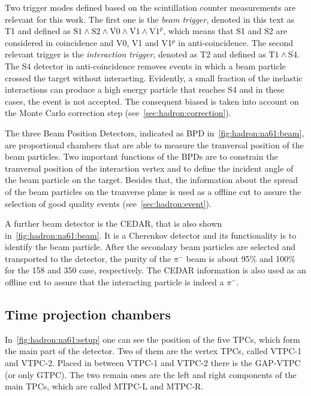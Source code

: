 Two trigger modes defined based on the scintillation counter measurements
are relevant for this work. The first one is the \emph{beam trigger},
denoted in this text as T1 and defined as 
$\text{S1}\wedge\text{S2}\wedge\overline{\text{V0}}\wedge\overline{\text{V1}}\wedge\overline{\text{V1}^p}$,
which means that S1 and S2 are considered in coincidence and V0, V1 and V1$^p$ in anti-coincidence.
The second relevant trigger is the \emph{interaction trigger}, denoted as T2
and defined as 
$\text{T1}\wedge\overline{\text{S4}}$.
The S4 detector in anti-coincidence removes events in which a beam
particle crossed the target without interacting. Evidently,
a small fraction of the inelastic interactions can produce
a high energy particle that reaches S4 and in these cases, the
event is not accepted. The consequent biased is taken into
account on the Monte Carlo correction step (see~\cref{sec:hadron:correction}).

The three Beam Position Detectors, indicated as BPD in~\cref{fig:hadron:na61:beam},
are proportional chambers that are able to measure the tranversal position
of the beam particles. Two important functions of the BPDs are to constrain
the tranversal position of the interaction vertex and to define the
incident angle of the beam particle on the target. Besides that,
the information about the spread of the beam particles on the
tranverse plane is used as a offline cut to assure the
selection of good quality events (see~\cref{sec:hadron:event}).

A further beam detector is the CEDAR, that is also shown
in~\cref{fig:hadron:na61:beam}. It is a Cherenkov detector
and its functionality is to identify the beam particle.
After the secondary beam particles are selected and
transported to the \NASixtyOne detector, the purity of the
$\pi^-$ beam is about 95\% and 100\% for the 158 and 350 \GeVc
case, respectively. The CEDAR information is also used as
an offline cut to assure that the interacting particle
is indeed a $\pi^-$.



\subsection{Time projection chambers}
\label{sec:hadron:na61:tpc}

In~\cref{fig:hadron:na61:setup} one can see the
position of the five TPCs, which form the main part
of the \NASixtyOne detector. 
Two of them are the vertex TPCs, called
VTPC-1 and VTPC-2. Placed in between VTPC-1 and VTPC-2
there is the GAP-VTPC (or only GTPC). The two remain ones
are the left and right components of the main TPCs, which
are called MTPC-L and MTPC-R. 

